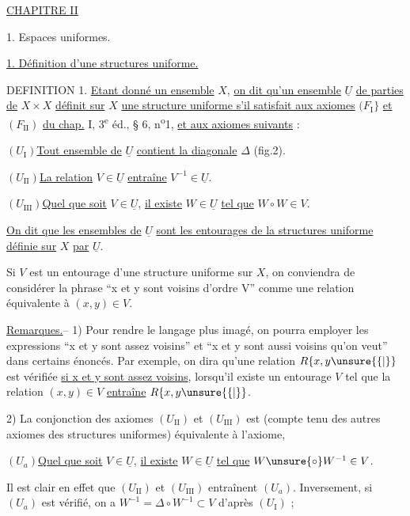 \uline{CHAPITRE II}


1. Espaces uniformes.

\uline{1. Définition d'une structures uniforme.}

DEFINITION 1. \uline{Etant donné un ensemble} $X$, \uline{on dit qu'un ensemble} $\underline U$ \uline{de parties de}
$X\times X$ \uline{définit sur} $X$ \uline{une structure uniforme s'il satisfait aux axiomes}
$(F_{\mathrm I}\}$ \uline{et} $(F_{\mathrm{II}})$ \uline{du chap.} I, 3\textsuperscript{e} éd., § 6, n\textsuperscript{o}1, \uline{et aux axiomes suivants} :

$(U_{\mathrm I})$\quad \uline{Tout ensemble de} $\underline U$ \uline{contient la diagonale} $\Delta$ (fig.2).

$(U_{\mathrm{II}})$\quad \uline{La relation} $V\in\underline U$ \uline{entraîne} $V^{-1}\in\underline U$.

$(U_{\mathrm{III}})$\quad \uline{Quel que soit} $V\in\underline U$, \uline{il existe} $W\in\underline U$ \uline{tel que} $W\circ W\in V$.

\uline{On dit que les ensembles de} $\underline U$ \uline{sont les entourages de la structures uniforme définie sur} $X$ \uline{par} $\underline U$.

Si $V$ est un entourage d'une structure uniforme sur $X$, on conviendra de
considérer la phrase ``x et y sont voisins d'ordre V'' comme une relation équivalente à $(x,y)\in V$.

\uline{Remarques.}-- 1) Pour rendre le langage plus imagé, on pourra employer
les expressions ``x et y sont assez voisins'' et ``x et y sont aussi
voisins qu'on veut'' dans certains énoncés. Par exemple, on dira
qu'une relation $R\{x,y\unsure{\{|\}}$ est vérifiée \uline{si x et y sont assez voisins},
lorsqu'il existe un entourage $V$ tel que la relation $(x,y)\in V$ \uline{entraîne} $R\{x,y\unsure{\{|\}}$.

2) La conjonction des axiomes $(U_{\mathrm{II}})$ et $(U_{\mathrm{III}})$ est (compte tenu des autres axiomes des structures uniformes) équivalente à l'axiome,

$(U_a)$\quad \uline{Quel que soit} $V\in\underline U$, \uline{il existe} $W\in\underline U$ \uline{tel que} $W\unsure{\circ}W^{-1}\in V$.

Il est clair en effet que $(U_{\mathrm{II}})$ et $(U_{\mathrm{III}})$ entraînent $(U_a)$. Inversement, si $(U_a)$ est vérifié, on a $W^{-1}=\Delta\circ W^{-1}\subset V$ d'après $(U_{\mathrm I})$ ;
